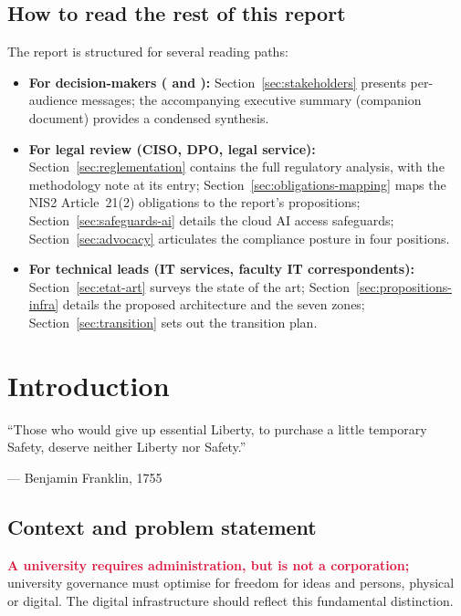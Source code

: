 \subsection{How to read the rest of this report}

The report is structured for several reading paths:

\begin{itemize}[nosep]
    \item \textbf{For decision-makers ( and ):}
    Section~\ref{sec:stakeholders} presents per-audience
    messages; the accompanying executive summary (companion
    document) provides a condensed synthesis.
    \item \textbf{For legal review (CISO, DPO, legal service):}
    Section~\ref{sec:reglementation} contains the full regulatory
    analysis, with the methodology note at its entry;
    Section~\ref{sec:obligations-mapping} maps the
    NIS2 Article~21(2) obligations to the report's propositions;
    Section~\ref{sec:safeguards-ai} details the cloud AI access
    safeguards; Section~\ref{sec:advocacy} articulates the
    compliance posture in four positions.
    \item \textbf{For technical leads (IT services, faculty IT
    correspondents):} Section~\ref{sec:etat-art} surveys the
    state of the art; Section~\ref{sec:propositions-infra}
    details the proposed architecture and the seven zones;
    Section~\ref{sec:transition} sets out the transition plan.
\end{itemize}

\section{Introduction}
\label{sec:introduction}

\epigraph{``Those who would give up essential Liberty, to purchase a little temporary Safety, deserve neither Liberty nor Safety.''}{--- Benjamin Franklin, 1755~\cite{franklin1755}}

\subsection{Context and problem statement}

\textcolor{Crimson}{\textbf{A university requires administration, but is not a corporation;}}
university governance must optimise for freedom for ideas and persons,
physical or digital. The digital infrastructure should reflect this
fundamental distinction.

